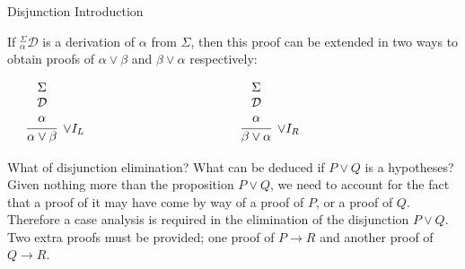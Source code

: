 \documentclass{book}
\begin{document}
    \begin{definition}{Disjunction Introduction}

        If $^{\Sigma}_{\alpha}\mathcal{D}$ is a derivation of $\alpha$ from $\Sigma$, then this proof can be extended in two ways to obtain proofs of $\alpha \lor \beta$ and $\beta \lor \alpha$ respectively: 

        \begin{center}
            $\begin{array} { c c c }
            
                \begin{array}{ c c }		
                    \begin{array}{c}		
                        \infer[\lor I_{L}]{\alpha \lor \beta}
                        {\begin{array}{c} \Sigma \\ \mathcal{D} \\ \alpha \end{array}}
                    \end{array}
                \end{array}
    
            & \hspace{3cm} &
    
            \begin{array}{ c c }		
                \begin{array}{c}		
                    \infer[\lor I_{R}]{\beta \lor \alpha}
                    {\begin{array}{c} \Sigma \\ \mathcal{D} \\ \alpha \end{array}}
                \end{array}
            \end{array}	\\		
    
            \end{array}$
        \end{center}	
    \end{definition}

    What of disjunction elimination? What can be deduced if $P \lor Q$ is a hypotheses? Given nothing more than the proposition $P \lor Q$, we need to account for the fact that a proof of it may have come by way of a proof of $P$, or a proof of $Q$. Therefore a case analysis is required in the elimination of the disjunction $P \lor Q$. Two extra proofs must be provided; one proof of $P \to R$ and another proof of $Q \to R$. 
\end{document}
